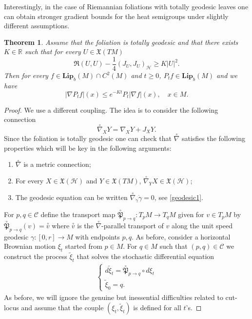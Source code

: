 \documentclass[11pt]{article}
\numberwithin{equation}{section}
\newtheorem{theorem}{Theorem}[section]
\newcommand{\Ho}{\mathcal H}
\begin{document}
Interestingly, in the case of Riemannian foliations with totally geodesic leaves one can obtain stronger gradient bounds for the heat semigroups under slightly different assumptions.

\begin{theorem}\label{GB total}
 Assume that the foliation is totally geodesic and that there exists $K \in \mathbb{R}$ such that for every $U \in \mathfrak{X}(TM)$
\[
\mathfrak{R}(U,U) -\frac{1}{4} (J_U,J_U)_\Ho \ge K |U|^2.
\] 
Then for every $f \in \mathbf{Lip}_b (M) \cap C^2(M)$ and $t \ge 0$, $P_tf \in \mathbf{Lip}_b (M)$ and we have
\[
|\nabla P_t f|(x)\le e^{-Kt} P_t |\nabla f| (x), \quad x \in M.
\] 
\end{theorem}

\begin{proof}
We use a  different coupling. The idea is to consider the following connection
\[
\overset{\circ}{\nabla}_X Y=\nabla_XY +J_XY.
\]
Since the foliation is totally geodesic one can check that $\overset{\circ}{\nabla}$ satisfies the following properties which will be key in the following arguments:
\begin{enumerate}
\item $\overset{\circ}{\nabla}$ is a metric connection;
\item For every $X \in \mathfrak{X}(\Ho)$ and $Y \in \mathfrak{X}(TM)$, $\overset{\circ}{\nabla}_Y X \in \mathfrak{X}(\Ho)$;
\item The geodesic equation can be written $\overset{\circ}{\nabla}_{\dot \gamma} \dot\gamma=0$, see \eqref{geodesic1}.
\end{enumerate}
For $p,q \in \mathcal{C}$ define the transport map $\overset{\circ}{\mathfrak{P}}_{p \to q}:T_pM \to T_qM$ given for $v \in T_pM$ by $\overset{\circ}{\mathfrak{P}}_{p \to q}(v)=\overset{\circ}{v}$ where $\overset{\circ}{v}$ is the $\overset{\circ}{\nabla}$-parallel transport of $v$ along the unit speed geodesic $\gamma:[0,r] \to M$ with endpoints $p,q$. As before, consider  a horizontal Brownian motion $\xi_t$ started from $p \in M$. For $q \in M$ such that $(p,q) \in \mathcal{C}$ we construct the process $\tilde{\xi}_t$ that solves the stochastic differential equation
\begin{align*}
\begin{cases}
d\tilde{\xi}_t=\overset{\circ}{\mathfrak{P}}_{p \to q} \circ d\xi_t \\
\tilde{\xi}_0=q.
\end{cases}
\end{align*}
As before, we will  ignore the genuine but inessential difficulties related to cut-locus and assume that the couple $(\xi_t,\tilde{\xi}_t)$ is defined for all $t$'s. 


\end{proof}
\end{document}
